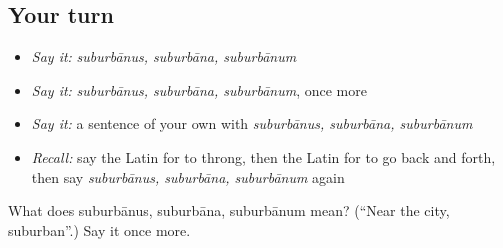 \subsection*{Your turn}
\begin{itemize}
\raggedright
  \item \emph{Say it:} \emph{suburbānus, suburbāna, suburbānum}
  \item \emph{Say it:} \emph{suburbānus, suburbāna, suburbānum}, once more
  \item \emph{Say it:} a sentence of your own with \emph{suburbānus, suburbāna, suburbānum}
  \item \emph{Recall:} say the Latin for to throng, then the Latin for to go back and forth, then say \emph{suburbānus, suburbāna, suburbānum} again
\end{itemize}

\begin{tcolorbox}[breakable,colback=teal!4,colframe=teal!35!black,title={Before you move on}]
What does suburbānus, suburbāna, suburbānum mean? (\textquotedblleft{}Near the city, suburban\textquotedblright{}.) Say it once more.
\end{tcolorbox}
